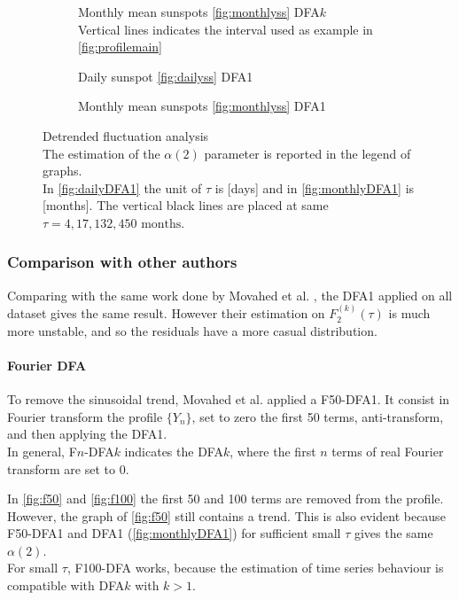 \begin{figure}[!h]
	\centering
	\begin{subfigure}{\textwidth}
		\centering
		
		\caption{Monthly mean sunspots \ref{fig:monthlyss} DFA$k$\\ Vertical lines indicates the interval used as example in \autoref{fig:profilemain}}\label{fig:DFAk}
	\end{subfigure}
	\vfill
	\begin{subfigure}{0.48\textwidth}
		\centering
		
		\caption{Daily sunspot \ref{fig:dailyss} DFA1}\label{fig:dailyDFA1}
	\end{subfigure}
	\hfill
	\begin{subfigure}{0.48\textwidth}
		\centering
		
		\caption{Monthly mean sunspots \ref{fig:monthlyss} DFA1}\label{fig:monthlyDFA1}
	\end{subfigure}
	\caption{Detrended fluctuation analysis\\
	The estimation of the $\alpha(2)$ parameter is reported in the legend of graphs.\\
	In \autoref{fig:dailyDFA1} the unit of $\tau$ is [days] and in \autoref{fig:monthlyDFA1} is [months]. The vertical black lines are placed at same $\tau = 4,17, 132, 450 \text{ months}$.}\label{fig:DFA}
\end{figure}

\subsubsection*{Comparison with other authors}
Comparing with the same work done by Movahed et al. \cite{Movahed_2006}, the DFA1 applied on all dataset gives the same result. However their estimation on $F_2^{( k )}(\tau)$ is much more unstable, and so the residuals have a more casual distribution. 

\paragraph{Fourier DFA}
To remove the sinusoidal trend, Movahed et al. applied a F50-DFA1. It consist in Fourier transform the profile $\{ Y_n \}$, set to zero the first 50 terms, anti-transform, and then applying the DFA1. \\
In general, F$n$-DFA$k$ indicates the DFA$k$, where the first $n$ terms of real Fourier transform are set to 0.  

In \autoref{fig:f50} and \autoref{fig:f100} the first 50 and 100 terms are removed from the profile. However, the graph of \autoref{fig:f50} still contains a trend. This is also evident because F50-DFA1 and DFA1 (\autoref{fig:monthlyDFA1}) for sufficient small $\tau$ gives the same $\alpha(2)$.\\
For small $\tau$, F100-DFA works, because the estimation of time series behaviour is compatible with DFA$k$ with $k>1$.

